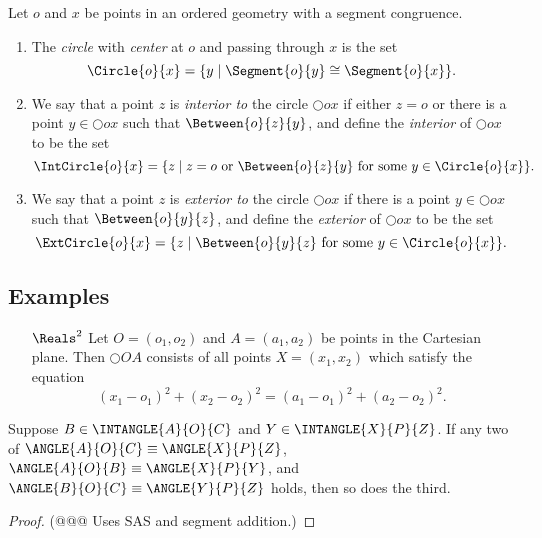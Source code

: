 \begin{dfn}[Circle]
Let \(o\) and \(x\) be points in an ordered geometry with a segment congruence.
\begin{enumerate}
\item The \emph{circle} with \emph{center} at \(o\) and passing through \(x\) is the set \[ \Circle{o}{x} = \{ y \mid \Segment{o}{y} \cong \Segment{o}{x} \}. \]
\item We say that a point \(z\) is \emph{interior to} the circle \(\Circle{o}{x}\) if either \(z = o\) or there is a point \(y \in \Circle{o}{x}\) such that \(\Between{o}{z}{y}\), and define the \emph{interior} of \(\Circle{o}{x}\) to be the set \[ \IntCircle{o}{x} = \{ z \mid z = o\ \mathrm{or}\ \Between{o}{z}{y}\ \mathrm{for\ some}\ y \in \Circle{o}{x} \}. \]
\item We say that a point \(z\) is \emph{exterior to} the circle \(\Circle{o}{x}\) if there is a point \(y \in \Circle{o}{x}\) such that \(\Between{o}{y}{z}\), and define the \emph{exterior} of \(\Circle{o}{x}\) to be the set \[ \ExtCircle{o}{x} = \{ z \mid \Between{o}{y}{z}\ \mathrm{for\ some}\ y \in \Circle{o}{x} \}. \]
\end{enumerate}
\end{dfn}

\subsection*{Examples}

\begin{enumerate}
\item[\(\Reals^2\)] Let \(O = (o_1, o_2)\) and \(A = (a_1, a_2)\) be points in the Cartesian plane.
Then \(\Circle{O}{A}\) consists of all points \(X = (x_1, x_2)\) which satisfy the equation \[ (x_1 - o_1)^2 + (x_2 - o_2)^2 = (a_1 - o_1)^2 + (a_2 - o_2)^2. \]
\end{enumerate}



\begin{prop}
Suppose \(B \in \INTANGLE{A}{O}{C}\) and \(Y \in \INTANGLE{X}{P}{Z}\).
If any two of \(\ANGLE{A}{O}{C} \equiv \ANGLE{X}{P}{Z}\), \(\ANGLE{A}{O}{B} \equiv \ANGLE{X}{P}{Y}\), and \(\ANGLE{B}{O}{C} \equiv \ANGLE{Y}{P}{Z}\) holds, then so does the third.
\end{prop}

\begin{proof}
(@@@ Uses SAS and segment addition.)
\end{proof}
